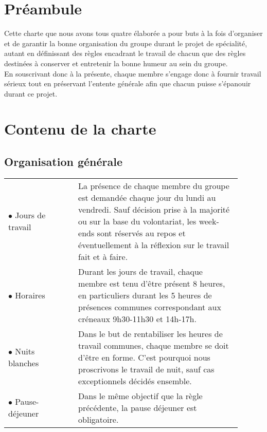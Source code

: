 \documentclass[a4paper,11pt]{article}
\begin{document}
\begin{spacing}{1.3}
		\vspace{-1cm}
		
		\section*{Préambule}

		Cette charte que nous avons tous quatre élaborée a pour buts à la fois d'organiser et de garantir la bonne organisation du groupe durant le projet de spécialité, autant en définissant des règles encadrant le travail de chacun que des règles destinées à conserver et entretenir la bonne humeur au sein du groupe.\\
	
		En souscrivant donc à la présente, chaque membre s'engage donc à fournir travail sérieux tout en préservant l'entente générale afin que chacun puisse s'épanouir durant ce projet.~~\\
		
		
		\section*{Contenu de la charte}
		
		\subsection*{Organisation générale}

		\begin{tabular}{p{0.2\linewidth}  p{0.005\linewidth} p{0.7\linewidth} }
			$\bullet$ Jours de travail & & La présence de chaque membre du groupe est demandée chaque jour du lundi au vendredi. Sauf décision prise à la majorité ou sur la base du volontariat, les week-ends sont réservés au repos et éventuellement à la réflexion sur le travail fait et à faire. \\[0.3cm]
			$\bullet$ Horaires & & Durant les jours de travail, chaque membre est tenu d'être présent 8 heures, en particuliers durant les 5 heures de présences communes correspondant aux créneaux 9h30-11h30 et 14h-17h.\\[0.3cm]
			$\bullet$ Nuits blanches & & Dans le but de rentabiliser les heures de travail communes, chaque membre se doit d'être en forme. C'est pourquoi nous proscrivons le travail de nuit, sauf cas exceptionnels décidés ensemble. \\[0.3cm]
			$\bullet$ Pause-déjeuner & & Dans le même objectif que la règle précédente, la pause déjeuner est obligatoire. \\[0.3cm]
			

\end{tabular}
\end{spacing}
\end{document}
